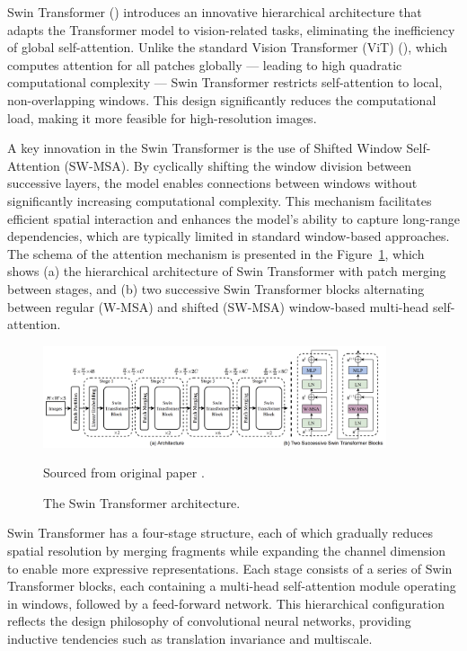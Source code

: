 \documentclass[a4paper,11pt,twoside]{report}
\theoremstyle{definition}
\begin{document}
Swin Transformer (\cite{swin}) introduces an innovative hierarchical architecture that adapts the Transformer model to vision-related tasks, eliminating the inefficiency of global self-attention. Unlike the standard Vision Transformer (ViT) (\cite{vit}), which computes attention for all patches globally — leading to high quadratic computational complexity — Swin Transformer restricts self-attention to local, non-overlapping windows. This design significantly reduces the computational load, making it more feasible for high-resolution images.

A key innovation in the Swin Transformer is the use of Shifted Window Self-Attention (SW-MSA). By cyclically shifting the window division between successive layers, the model enables connections between windows without significantly increasing computational complexity. This mechanism facilitates efficient spatial interaction and enhances the model’s ability to capture long-range dependencies, which are typically limited in standard window-based approaches. The schema of the attention mechanism is presented in the Figure~\ref{fig:swin}, which shows (a) the hierarchical architecture of Swin Transformer with patch merging between stages, and (b) two successive Swin Transformer blocks alternating between regular (W-MSA) and shifted (SW-MSA) window-based multi-head self-attention.


\begin{figure}
  \centering
  \includegraphics[width=0.9\textwidth]{img_methodology/swin.png}
  \caption{The Swin Transformer architecture.}
  \footnotesize{Sourced from original paper \cite{swin}.}
  \label{fig:swin}
\end{figure}

Swin Transformer has a four-stage structure, each of which gradually reduces spatial resolution by merging fragments while expanding the channel dimension to enable more expressive representations. Each stage consists of a series of Swin Transformer blocks, each containing a multi-head self-attention module operating in windows, followed by a feed-forward network. This hierarchical configuration reflects the design philosophy of convolutional neural networks, providing inductive tendencies such as translation invariance and multiscale.
\end{document}
